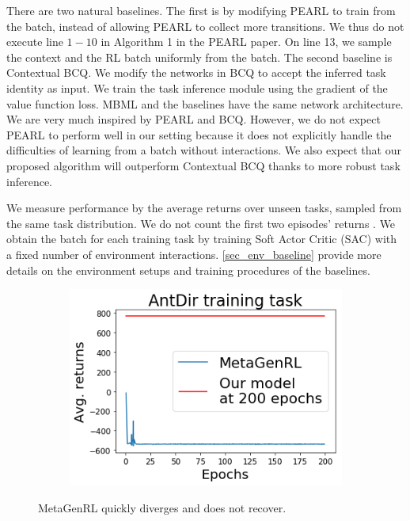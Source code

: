 There are two natural baselines. The first is by modifying PEARL \cite{rakelly2019efficient} to train from the batch, instead of allowing PEARL to collect more transitions. We thus do not execute line $1-10$ in Algorithm 1 in the PEARL paper. On line 13, we sample the context and the RL batch uniformly from the batch. The second baseline is Contextual BCQ. We modify the networks in BCQ to accept the inferred task identity as input. We train the task inference module using the gradient of the value function loss. MBML and the baselines have the same network architecture. We are very much inspired by PEARL and BCQ. However, we do not expect PEARL to perform well in our setting because it does not explicitly handle the difficulties of learning from a batch without interactions. We also expect that our proposed algorithm will outperform Contextual BCQ thanks to more robust task inference.

We measure performance by the average returns over unseen tasks, sampled from the same task distribution. We do not count the first two episodes' returns \cite{rakelly2019efficient}. We obtain the batch for each training task by training Soft Actor Critic (SAC) \cite{haarnoja2018soft} with a fixed number of environment interactions. \autoref{sec_env_baseline} provide more details on the environment setups and training procedures of the baselines.

\begin{figure}
    \vspace{-0.6em}
    \flushright
    \begin{subfigure}{0.155\paperwidth}
        \includegraphics[width=\linewidth]{chapter_2/fig/metagenrl.png}
    \end{subfigure}
    \caption{MetaGenRL quickly diverges and does not recover.} %
    \label{fig:metagenrl}
    \vspace{0.05em}
\end{figure}

